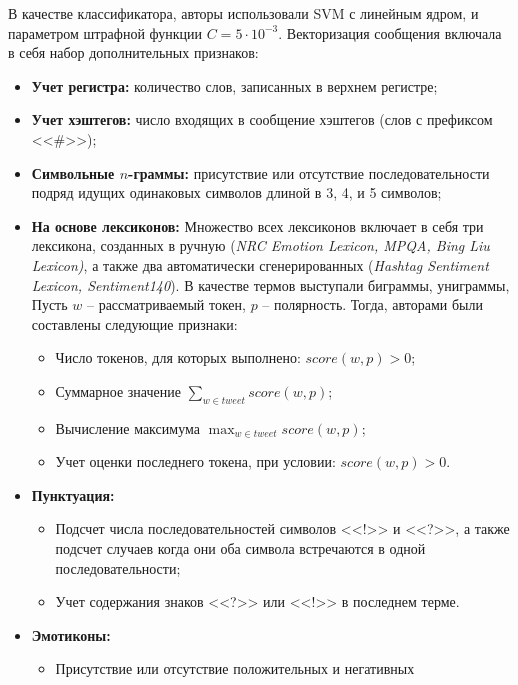     В качестве классификатора, авторы использовали SVM с линейным ядром, и
    параметром штрафной функции $C = 5\cdot 10^{-3}$.
    Векторизация сообщения включала в себя набор дополнительных признаков:
    \begin{itemize}
        \item {\bf Учет регистра:} количество слов, записанных в верхнем регистре;
        \item {\bf Учет хэштегов:} число входящих в сообщение хэштегов (слов с префиксом <<\#>>);
        \item {\bf Символьные $n$-граммы:} присутствие или отсутствие последовательности
            подряд идущих одинаковых символов длиной в 3, 4, и 5 символов;
        \item {\bf На основе лексиконов:}
            Множество всех лексиконов включает в себя три лексикона, созданных
            в ручную ({\it NRC Emotion Lexicon, MPQA, Bing Liu Lexicon)}, а также
            два автоматически сгенерированных ({\it Hashtag Sentiment Lexicon,
            Sentiment140}). В качестве термов выступали биграммы, униграммы,
            Пусть $w$ -- рассматриваемый токен, $p$ -- полярность. Тогда,
            авторами были составлены следующие признаки:%
            \begin{itemize}
                \item Число токенов, для которых выполнено: $score(w, p) > 0$;
                \item Суммарное значение $\sum_{w \in tweet} score(w,p)$;
                \item Вычисление максимума $\max_{w \in tweet} score(w,p)$;
                \item Учет оценки последнего токена, при условии: $score(w,p) > 0$.
            \end{itemize}
        \item {\bf Пунктуация:}
            \begin{itemize}
                \item Подсчет числа последовательностей символов <<!>> и <<?>>,
                    а также подсчет случаев когда они оба символа встречаются в одной последовательности;
                \item Учет содержания знаков <<?>> или <<!>> в последнем терме.
            \end{itemize}
        \item {\bf Эмотиконы:}
            \begin{itemize}
                \item Присутствие или отсутствие положительных и негативных

\end{itemize}
\end{itemize}
